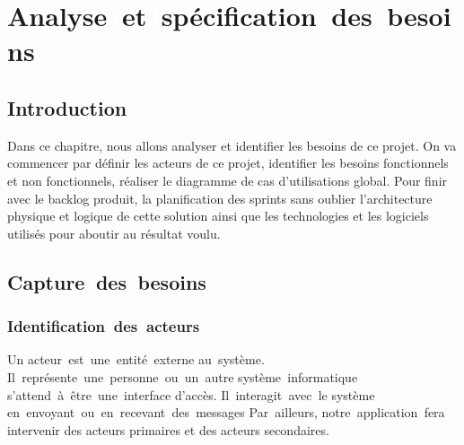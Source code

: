 \graphicspath{{./chapitres/chapitre2/figures/}}
\setcounter{mtc}{2}
\chapter{Analyse\textcolor{white}{J}et\textcolor{white}{J}spécification\textcolor{white}{J}des\textcolor{white}{J}besoins}
\minitoc
\newpage
\section*{Introduction}
Dans ce chapitre, nous allons analyser et identifier les besoins de ce projet. On va commencer par définir les acteurs de ce projet, identifier les besoins fonctionnels et non fonctionnels, réaliser le diagramme de cas d’utilisations global. Pour finir avec le backlog produit, la planification des sprints sans oublier l’architecture physique et logique de cette solution ainsi que les technologies et les logiciels utilisés pour aboutir au résultat voulu.


\section{Capture\textcolor{white}{J}des\textcolor{white}{J}besoins}
\subsection{Identification\textcolor{white}{J}des\textcolor{white}{J}acteurs}

Un acteur\textcolor{white}{J}est\textcolor{white}{J}une\textcolor{white}{J}entité\textcolor{white}{J}externe au\textcolor{white}{J}système. Il\textcolor{white}{J}représente\textcolor{white}{J}une\textcolor{white}{J}personne\textcolor{white}{J}ou\textcolor{white}{J}un\textcolor{white}{J}autre système\textcolor{white}{J}informatique s'attend\textcolor{white}{J}à\textcolor{white}{J}être\textcolor{white}{J}une\textcolor{white}{J}interface d'accès. Il\textcolor{white}{J}interagit\textcolor{white}{J}avec\textcolor{white}{J}le système en\textcolor{white}{J}envoyant\textcolor{white}{J}ou\textcolor{white}{J}en\textcolor{white}{J}recevant\textcolor{white}{J}des\textcolor{white}{J}messages
Par\textcolor{white}{J}ailleurs, notre\textcolor{white}{J}application\textcolor{white}{J}fera intervenir des acteurs primaires et des acteurs secondaires.

